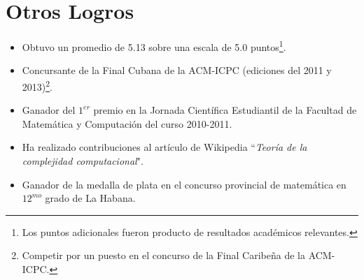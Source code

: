 \documentclass[]{friggeri-cv}
\begin{document}
\section{Otros Logros}
\begin{itemize}[noitemsep, nolistsep]

	\item Obtuvo un promedio de 5.13 sobre una escala de 5.0 puntos\footnote{Los puntos adicionales fueron producto de resultados académicos relevantes.}.\\

	\item Concursante de la Final Cubana de la ACM-ICPC (ediciones del 2011 y 2013)\footnote{Competir por un puesto en el concurso de la Final Caribeña de la ACM-ICPC.}.\\

	\item Ganador del $1^{er}$ premio en la Jornada Científica Estudiantil de la Facultad de Matemática y Computación del curso 2010-2011.\\
	
	\item Ha realizado contribuciones al artículo de Wikipedia ``\emph{Teoría de la complejidad computacional}".\\
		
	\item Ganador de la medalla de plata en el concurso provincial de matemática en $12^{mo}$ grado de La Habana.\\
	
	
	
	
\end{itemize}
\end{document}
